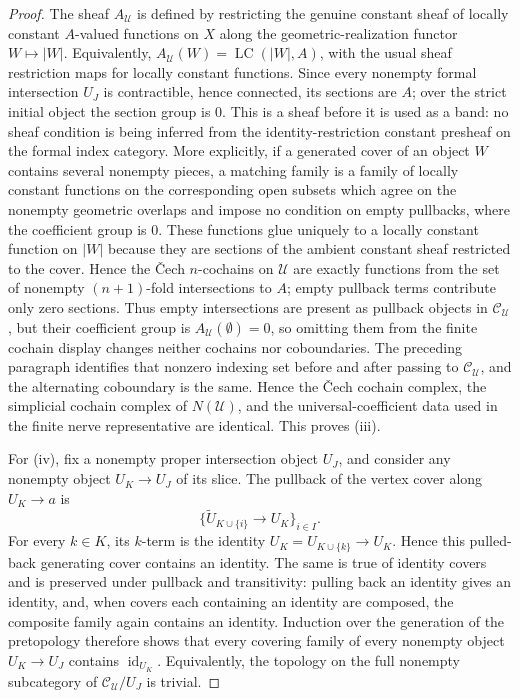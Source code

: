 \begin{proof}
The sheaf \(A_{\mathcal U}\) is defined by restricting the genuine
constant sheaf of locally constant \(A\)-valued functions on \(X\) along
the geometric-realization functor \(W\mapsto |W|\). Equivalently,
\(A_{\mathcal U}(W)=\operatorname{LC}(|W|,A)\), with the usual sheaf
restriction maps for locally constant functions. Since every nonempty
formal intersection \(U_J\) is contractible, hence connected, its sections
are \(A\); over the strict initial object the section group is \(0\). This
is a sheaf before it is used as a band: no sheaf condition is being
inferred from the identity-restriction constant presheaf on the formal
index category. More explicitly, if a generated cover of an object \(W\)
contains several nonempty pieces, a matching family is a family of locally
constant functions on the corresponding open subsets which agree on the
nonempty geometric overlaps and impose no condition on empty pullbacks,
where the coefficient group is \(0\). These functions glue uniquely to a
locally constant function on \(|W|\) because they are sections of the
ambient constant sheaf restricted to the cover.
Hence the \v{C}ech $n$-cochains on
$\mathcal U$ are exactly functions from the set of nonempty
$(n+1)$-fold intersections to $A$; empty pullback terms contribute only
zero sections. Thus empty intersections are present as pullback objects
in $\mathcal C_{\mathcal U}$, but their coefficient group is
$A_{\mathcal U}(\emptyset)=0$, so omitting them from the finite cochain
display changes neither cochains nor coboundaries. The preceding
paragraph identifies that nonzero indexing set before and after passing
to $\mathcal C_{\mathcal U}$, and the alternating coboundary is the same.
Hence the \v{C}ech cochain complex, the simplicial cochain complex of
$N(\mathcal U)$, and the
universal-coefficient data used in the finite nerve representative are
identical. This proves \textup{(iii)}.

For \textup{(iv)}, fix a nonempty proper intersection object \(U_J\), and
consider any nonempty object \(U_K\to U_J\) of its slice. The pullback of the
vertex cover along \(U_K\to a\) is
\[
\{\widetilde U_{K\cup\{i\}}\to U_K\}_{i\in I}.
\]
For every \(k\in K\), its \(k\)-term is the identity
\(U_K=U_{K\cup\{k\}}\to U_K\). Hence this pulled-back generating cover
contains an identity. The same is true of identity covers and is preserved
under pullback and transitivity: pulling back an identity gives an identity,
and, when covers each containing an identity are composed, the composite
family again contains an identity. Induction over the generation of the
pretopology therefore shows that every covering family of every nonempty
object \(U_K\to U_J\) contains \(\operatorname{id}_{U_K}\). Equivalently,
the topology on the full nonempty subcategory of
\(\mathcal C_{\mathcal U}/U_J\) is trivial.


\end{proof}

